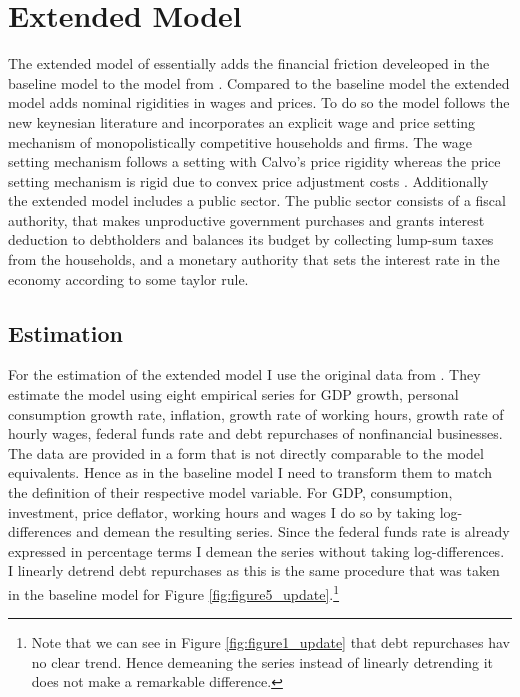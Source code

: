 \section{Extended Model}
\label{sec:extended_model}

The extended model of \textcite{jerman_macroeconomic_2012} essentially adds the
financial friction develeoped in the baseline model to the model from
\textcite{smets_shocks_2007}. Compared to the baseline model the extended model
adds nominal rigidities in wages and prices. To do so the model follows the new
keynesian literature and incorporates an explicit wage and price setting
mechanism of monopolistically competitive households and firms. The wage
setting mechanism follows a setting with Calvo's price
rigidity \parencite{calvo_staggered_1983} whereas the price setting mechanism
is rigid due to convex price adjustment
costs \parencite{rotemberg_sticky_1982}. Additionally the extended model
includes a public sector. The public sector consists of a fiscal authority,
that makes unproductive government purchases and grants interest deduction to
debtholders and balances its budget by collecting lump-sum taxes from the
households, and a monetary authority that sets the interest rate in the economy
according to some taylor rule.

\subsection{Estimation}
\label{sec:estimation}

For the estimation of the extended model I use the original data from
\textcite{jerman_macroeconomic_2012}. They estimate the model using eight
empirical series for GDP growth, personal consumption growth rate, inflation,
growth rate of working hours, growth rate of hourly wages, federal funds rate
and debt repurchases of nonfinancial businesses. The data are provided in a
form that is not directly comparable to the model equivalents. Hence as in the
baseline model I need to transform them to match the definition of their
respective model variable. For GDP, consumption, investment, price deflator,
working hours and wages I do so by taking log-differences and demean the
resulting series. Since the federal funds rate is already expressed in
percentage terms I demean the series without taking log-differences. I linearly
detrend debt repurchases as this is the same procedure that was taken in the
baseline model for Figure \ref{fig:figure5_update}.\footnote{Note that we can
  see in Figure \ref{fig:figure1_update} that debt repurchases hav no clear
  trend. Hence demeaning the series instead of linearly detrending it does not
  make a remarkable difference.}

